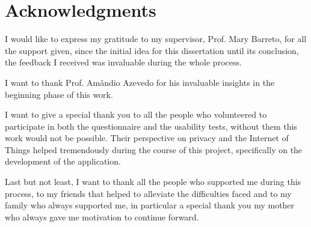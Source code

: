 %
%
\chapter*{Acknowledgments}

I would like to express my gratitude to my supervisor, Prof. Mary Barreto, for
all the support given, since the initial idea for this dissertation until its conclusion,
the feedback I received was invaluable during the whole process.

I want to thank Prof. Amândio Azevedo for his invaluable insights in the beginning phase of
this work.

I want to give a special thank you to all the people who volunteered to
participate in both the questionnaire and the usability tests, without them this work
would not be possible. Their perspective on privacy and the Internet of Things helped
tremendously during the course of this project, specifically on the development of the application.

Last but not least, I want to thank all the people who supported me during this
process, to my friends that helped to alleviate the difficulties faced and
to my family who always supported me, in particular a special thank you my mother
who always gave me motivation to continue forward.
